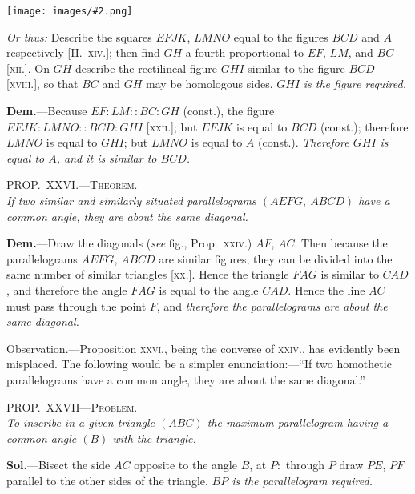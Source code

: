 \documentclass[oneside]{book}
\newcommand\myprop[2]{
\bigskip\Needspace*{4\baselineskip}\begin{center}\textsc{#1}\\\medskip\emph{#2}\par\end{center}
}
\newcommand\imgcent[2]{
\begin{center}
\texttt{[image: images/\#2.png]}
\end{center}
}
\begin{document}
\begin{footnotesize}
\imgcent{260}{f206}

\emph{Or thus:} Describe the squares $EFJK$, $LMNO$ equal to the
figures $BCD$ and $A$ respectively [II\@.~\textsc{xiv.}]; then find $GH$ a fourth
proportional to $EF$, $LM$, and $BC$ [\textsc{xii.}]. On $GH$ describe the
rectilineal figure $GHI$ similar to the figure $BCD$ [\textsc{xviii.}], so that
$BC$ and $GH$ may be homologous sides. $GHI$ \emph{is the figure required.}

\textbf{Dem.}---Because $EF: LM:: BC: GH$ (const.), the figure
$EFJK: LMNO:: BCD: GHI$ [\textsc{xxii.}]; but $EFJK$ is equal to
$BCD$ (const.); therefore $LMNO$ is equal to $GHI$; but $LMNO$ is
equal to $A$ (const.). \emph{Therefore $GHI$ is equal to $A$, and it is similar
to $BCD$.}
\par\end{footnotesize}

\myprop{PROP\@.~XXVI\@.---Theorem.}{If two similar and similarly situated parallelograms
$(AEFG,\ ABCD)$ have a common angle, they are about
the same diagonal.}

\textbf{Dem.}---Draw the diagonals (\emph{see} fig., Prop.~\textsc{xxiv.})
$AF$, $AC$. Then because the parallelograms $AEFG$,
$ABCD$ are similar figures, they can be divided into
the same number of similar triangles [\textsc{xx.}]. Hence
the triangle $FAG$ is similar to $CAD$, and therefore
the angle $FAG$ is equal to the angle $CAD$. Hence
the line $AC$ must pass through the point $F$, and \emph{therefore
the parallelograms are about the same diagonal.}

\smallskip
\begin{footnotesize}
\textsf{Observation.}---Proposition \textsc{xxvi.}, being the converse of \textsc{xxiv.},
has evidently been misplaced. The following would be a simpler
enunciation:---``If two homothetic parallelograms have a common
angle, they are about the same diagonal.''
\par\end{footnotesize}

\myprop{PROP\@.~XXVII---Problem.}{To inscribe in a given triangle $(ABC)$ the maximum
parallelogram having a common angle $(B)$ with the triangle.}

\textbf{Sol.}---Bisect the side $AC$ opposite to the angle $B$, at
$P:$ through $P$ draw $PE$, $PF$ parallel to the other sides
of the triangle. \emph{$BP$ is the parallelogram required.}
\end{document}
